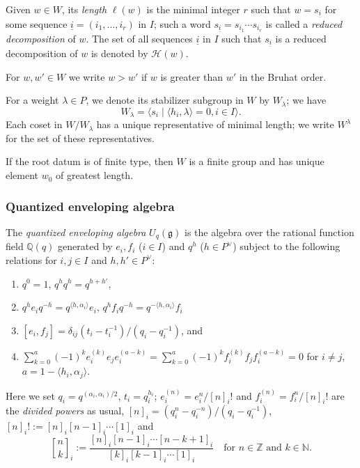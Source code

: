 \documentclass[final]{amsart}
\theoremstyle{plain}
\theoremstyle{definition}
\newcommand{\qbinom}{\genfrac{[}{]}{0pt}{}}
\newcommand{\calH}{\mathcal H}
\newcommand{\bbN}{\mathbb N}
\newcommand{\bbQ}{\mathbb Q}
\newcommand{\bbZ}{\mathbb Z}
\newcommand{\frakg}{\mathfrak g}
\newcommand{\uli}{{\underline i}}
\begin{document}
Given $w \in W$, its \emph{length} $\ell(w)$ is the minimal integer $r$ such that $w = s_\uli$ for some sequence $\uli = (i_1, \dots, i_r)$ in $I$; such a word $s_\uli = s_{i_1}\cdots s_{i_r}$ is called a \emph{reduced decomposition} of $w$.
The set of all sequences $\uli$ in $I$ such that $s_\uli$ is a reduced decomposition of $w$ is denoted by $\calH(w)$.

For $w, w' \in W$ we write $w > w'$ if $w$ is greater than $w'$ in the Bruhat order.

For a weight $\lambda \in P$, we denote its stabilizer subgroup in $W$ by $W_\lambda$; we have
\[
    W_\lambda = \langle s_i \mid \langle h_i, \lambda\rangle = 0, i \in I \rangle.
\]
Each coset in $W/W_\lambda$ has a unique representative of minimal length; we write $W^\lambda$ for the set of these representatives.

If the root datum is of finite type, then $W$ is a finite group and has unique element $w_0$ of greatest length.

\subsubsection*{Quantized enveloping algebra}
\label{section:definition-quantized-enveloping-algebra}

The \emph{quantized enveloping algebra} $U_q(\frakg)$ is the algebra over the rational function field $\bbQ(q)$ generated by $e_i, f_i$ ($i\in I$) and $q^h$ ($h\in P^\vee$) subject to the following relations for $i, j \in I$ and $h, h' \in P^\vee$:
\begin{enumerate}
    \item $q^0 = 1$, $q^h q^h = q^{h+h'}$,
    \item $q^h e_i q^{-h} = q^{\langle h, \alpha_i\rangle} e_i$, $q^h f_i q^{-h} = q^{-\langle h, \alpha_i\rangle} f_i$
    \item $[e_i, f_j] = \delta_{ij} (t_i - t_i^{-1})/(q_i - q_i^{-1})$, and
    \item $\sum_{k=0}^a (-1)^k e_i^{(k)} e_j e_i^{(a-k)} = \sum_{k=0}^a (-1)^k f_i^{(k)} f_j f_i^{(a-k)} = 0$ for $i \neq j$, $a = 1 - \langle h_i, \alpha_j\rangle$.
\end{enumerate}
Here we set $q_i = q^{(\alpha_i,\alpha_i)/2}$, $t_i = q_i^{h_i}$; $e_i^{(n)} = e_i^n/[n]_i!$ and $f_i^{(n)} = f_i^n/[n]_i!$ are the \emph{divided powers} as usual, $[n]_i = (q_i^n - q_i^{-n})/(q_i - q_i^{-1})$, $[n]_i! := [n]_i [n-1]_i \cdots [1]_i$ and
\[
    \qbinom{n}{k}_i := \frac{[n]_i [n-1]_i\cdots [n-k+1]_i}{[k]_i [k-1]_i \cdots [1]_i} \quad \text{for } n \in \bbZ \text{ and } k \in \bbN.
\]
\end{document}

